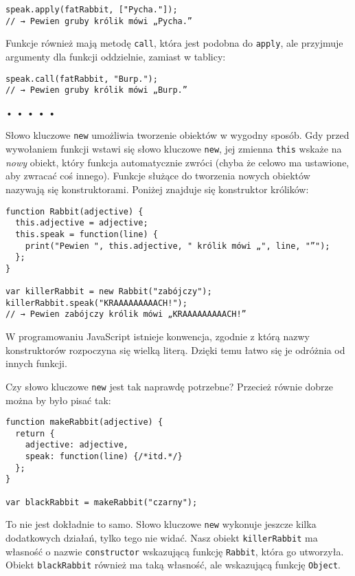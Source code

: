   
\begin{verbatim} 
speak.apply(fatRabbit, ["Pycha."]);
// → Pewien gruby królik mówi „Pycha.”
\end{verbatim}
  
Funkcje również mają metodę \texttt{call}, która jest podobna do \texttt{apply}, ale przyjmuje argumenty dla funkcji oddzielnie, zamiast w tablicy:

  
\begin{verbatim} 
speak.call(fatRabbit, "Burp.");
// → Pewien gruby królik mówi „Burp.”
\end{verbatim}


\begin{center}
• • • • •
\end{center}

  
Słowo kluczowe \texttt{new} umożliwia tworzenie obiektów w wygodny sposób. Gdy przed wywołaniem funkcji wstawi się słowo kluczowe \texttt{new}, jej zmienna \texttt{this} wskaże na \emph{nowy} obiekt, który funkcja automatycznie zwróci (chyba że celowo ma ustawione, aby zwracać coś innego). Funkcje służące do tworzenia nowych obiektów nazywają się konstruktorami. Poniżej znajduje się konstruktor królików:

  
\begin{verbatim} 
function Rabbit(adjective) {
  this.adjective = adjective;
  this.speak = function(line) {
    print("Pewien ", this.adjective, " królik mówi „", line, "”");
  };
}

var killerRabbit = new Rabbit("zabójczy");
killerRabbit.speak("KRAAAAAAAAACH!");
// → Pewien zabójczy królik mówi „KRAAAAAAAAACH!”
\end{verbatim}
  
W programowaniu JavaScript istnieje konwencja, zgodnie z którą nazwy konstruktorów rozpoczyna się wielką literą. Dzięki temu łatwo się je odróżnia od innych funkcji.

  
Czy słowo kluczowe \texttt{new} jest tak naprawdę potrzebne? Przecież równie dobrze można by było pisać tak:

  
\begin{verbatim} 
function makeRabbit(adjective) {
  return {
    adjective: adjective,
    speak: function(line) {/*itd.*/}
  };
}

var blackRabbit = makeRabbit("czarny");
\end{verbatim}
  
To nie jest dokładnie to samo. Słowo kluczowe \texttt{new} wykonuje jeszcze kilka dodatkowych działań, tylko tego nie widać. Nasz obiekt \texttt{killerRabbit} ma własność o nazwie \texttt{constructor} wskazującą funkcję \texttt{Rabbit}, która go utworzyła. Obiekt \texttt{blackRabbit} również ma taką własność, ale wskazującą funkcję \texttt{Object}.

